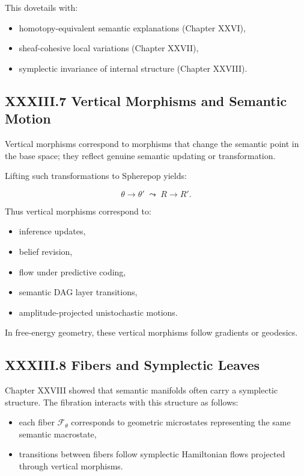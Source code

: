 \documentclass[12pt,letterpaper]{article}
\begin{document}
This dovetails with:

\begin{itemize}
    \item homotopy-equivalent semantic explanations (Chapter XXVI),
    \item sheaf-cohesive local variations (Chapter XXVII),
    \item symplectic invariance of internal structure (Chapter XXVIII).
\end{itemize}

\subsection{XXXIII.7 Vertical Morphisms and Semantic Motion}

Vertical morphisms correspond to morphisms that change the semantic point in the base space; they reflect genuine semantic updating or transformation.

Lifting such transformations to Spherepop yields:

\[
\theta \to \theta' \;\leadsto\; R \to R'.
\]

Thus vertical morphisms correspond to:

\begin{itemize}
    \item inference updates,
    \item belief revision,
    \item flow under predictive coding,
    \item semantic DAG layer transitions,
    \item amplitude-projected unistochastic motions.
\end{itemize}

In free-energy geometry, these vertical morphisms follow gradients or geodesics.

\subsection{XXXIII.8 Fibers and Symplectic Leaves}

Chapter XXVIII showed that semantic manifolds often carry a symplectic structure. The fibration interacts with this structure as follows:

\begin{itemize}
    \item each fiber $\mathcal{F}_\theta$ corresponds to geometric microstates representing the same semantic macrostate,
    \item transitions between fibers follow symplectic Hamiltonian flows projected through vertical morphisms.
\end{itemize}
\end{document}
